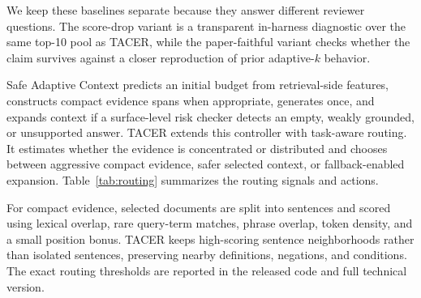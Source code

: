 \documentclass[11pt]{article}
\begin{document}
We keep these baselines separate because they answer different reviewer questions. The score-drop variant is a transparent in-harness diagnostic over the same top-10 pool as TACER, while the paper-faithful variant checks whether the claim survives against a closer reproduction of prior adaptive-$k$ behavior.

Safe Adaptive Context predicts an initial budget from retrieval-side features, constructs compact evidence spans when appropriate, generates once, and expands context if a surface-level risk checker detects an empty, weakly grounded, or unsupported answer. TACER extends this controller with task-aware routing. It estimates whether the evidence is concentrated or distributed and chooses between aggressive compact evidence, safer selected context, or fallback-enabled expansion. Table~\ref{tab:routing} summarizes the routing signals and actions.

\begin{table}[t]
\centering
\small
\caption{TACER routing signals and actions. The policy is task-aware but not dataset-specific.}
\label{tab:routing}
\end{table}

For compact evidence, selected documents are split into sentences and scored using lexical overlap, rare query-term matches, phrase overlap, token density, and a small position bonus. TACER keeps high-scoring sentence neighborhoods rather than isolated sentences, preserving nearby definitions, negations, and conditions. The exact routing thresholds are reported in the released code and full technical version.
\end{document}
